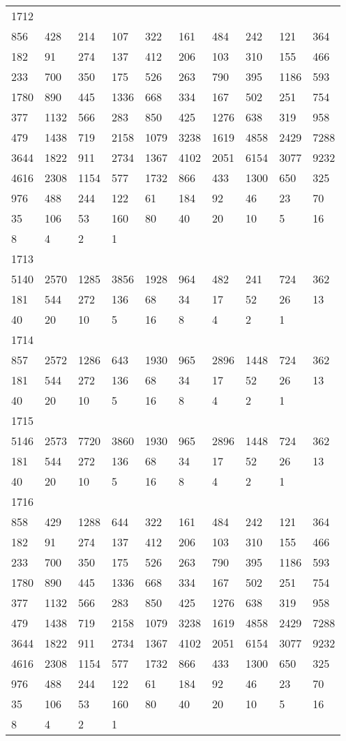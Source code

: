 \begin{longtable}{*{10}{l}}
1712&&&&&&&&&\\
856& 428& 214& 107& 322& 161& 484& 242& 121& 364\\
182& 91& 274& 137& 412& 206& 103& 310& 155& 466\\
233& 700& 350& 175& 526& 263& 790& 395& 1186& 593\\
1780& 890& 445& 1336& 668& 334& 167& 502& 251& 754\\
377& 1132& 566& 283& 850& 425& 1276& 638& 319& 958\\
479& 1438& 719& 2158& 1079& 3238& 1619& 4858& 2429& 7288\\
3644& 1822& 911& 2734& 1367& 4102& 2051& 6154& 3077& 9232\\
4616& 2308& 1154& 577& 1732& 866& 433& 1300& 650& 325\\
976& 488& 244& 122& 61& 184& 92& 46& 23& 70\\
35& 106& 53& 160& 80& 40& 20& 10& 5& 16\\
8& 4& 2& 1& \\

1713&&&&&&&&&\\
5140& 2570& 1285& 3856& 1928& 964& 482& 241& 724& 362\\
181& 544& 272& 136& 68& 34& 17& 52& 26& 13\\
40& 20& 10& 5& 16& 8& 4& 2& 1& \\

1714&&&&&&&&&\\
857& 2572& 1286& 643& 1930& 965& 2896& 1448& 724& 362\\
181& 544& 272& 136& 68& 34& 17& 52& 26& 13\\
40& 20& 10& 5& 16& 8& 4& 2& 1& \\

1715&&&&&&&&&\\
5146& 2573& 7720& 3860& 1930& 965& 2896& 1448& 724& 362\\
181& 544& 272& 136& 68& 34& 17& 52& 26& 13\\
40& 20& 10& 5& 16& 8& 4& 2& 1& \\

1716&&&&&&&&&\\
858& 429& 1288& 644& 322& 161& 484& 242& 121& 364\\
182& 91& 274& 137& 412& 206& 103& 310& 155& 466\\
233& 700& 350& 175& 526& 263& 790& 395& 1186& 593\\
1780& 890& 445& 1336& 668& 334& 167& 502& 251& 754\\
377& 1132& 566& 283& 850& 425& 1276& 638& 319& 958\\
479& 1438& 719& 2158& 1079& 3238& 1619& 4858& 2429& 7288\\
3644& 1822& 911& 2734& 1367& 4102& 2051& 6154& 3077& 9232\\
4616& 2308& 1154& 577& 1732& 866& 433& 1300& 650& 325\\
976& 488& 244& 122& 61& 184& 92& 46& 23& 70\\
35& 106& 53& 160& 80& 40& 20& 10& 5& 16\\
8& 4& 2& 1& \\


\end{longtable}
